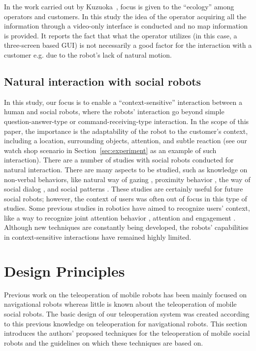 \documentclass[a4paper, 10pt, conference]{ieeeconf}     %
\begin{document}
In the work carried out by Kuzuoka~\cite{kuzuoka:dual}, focus is given to the ``ecology'' among operators and customers. In this study the idea of the operator acquiring all the information through a video-only interface is conducted and no map information is provided. 
It reports the fact that what the operator utilizes (in this case, a three-screen based GUI) is not necessarily a good factor for the interaction with a customer e.g. due to the robot's lack of natural motion.


\subsection{Natural interaction with social robots}
In this study, our focus is to enable a ``context-sensitive'' interaction between a human and social robots, where the robots' interaction go beyond simple question-answer-type or command-receiving-type  interaction. 
In the scope of this paper, the importance is the adaptability of the robot to the customer's context, including a location, surrounding objects, attention, and subtle reaction (see our watch shop scenario in Section~\ref{sec:experiment} as an example of such interaction).
There are a number of studies with social robots conducted for natural interaction. 
There are many aspects to be studied, such as knowledge on non-verbal behaviors, like natural way of gazing \cite{carff:human, drury:lassoing}, proximity behavior \cite{drury:decomposition, drury:awareness}, the way of social dialog \cite{green:applying}, and social patterns \cite{woods:comparing}. 
These studies are certainly useful for future social robots; however, the context of users was often out of focus in this type of studies.
Some previous studies in robotics have aimed to recognize users' context, like a way to recognize joint attention behavior \cite{glas:simultaneous}, attention \cite{glas:field} and engagement \cite{glas:laser}. 
Although new techniques are constantly being developed, the robots' capabilities in context-sensitive interactions have remained highly limited.

\section{Design Principles}
Previous work on the teleoperation of mobile robots has been mainly focused on navigational robots whereas little is known about the teleoperation of mobile social robots.
The basic design of our teleoperation system was created according to this previous knowledge on teleoperation for navigational robots. 
This section introduces the authors' proposed techniques for the teleoperation of mobile social robots and the guidelines on which these techniques are based on.
\end{document}
